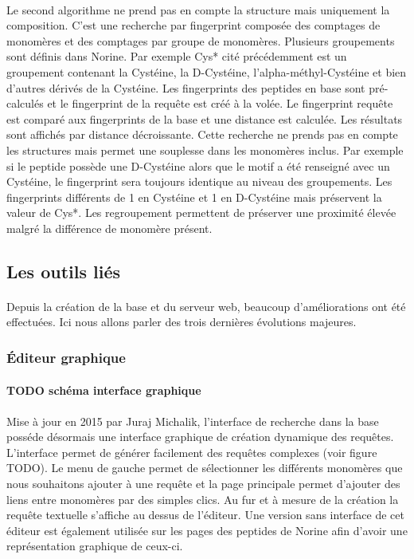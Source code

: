 \documentclass[12pt,french,twoside]{report}
\begin{document}
\paragraph{}Le second algorithme ne prend pas en compte la structure mais uniquement la composition.
C'est une recherche par fingerprint composée des comptages de monomères et des comptages par groupe de monomères.
Plusieurs groupements sont définis dans Norine.
Par exemple Cys* cité précédemment est un groupement contenant la Cystéine, la D-Cystéine, l'alpha-méthyl-Cystéine et bien d'autres dérivés de la Cystéine.
Les fingerprints des peptides en base sont pré-calculés et le fingerprint de la requête est créé à la volée.
Le fingerprint requête est comparé aux fingerprints de la base et une distance est calculée.
Les résultats sont affichés par distance décroissante.
Cette recherche ne prends pas en compte les structures mais permet une souplesse dans les monomères inclus.
Par exemple si le peptide possède une D-Cystéine alors que le motif a été renseigné avec un Cystéine, le fingerprint sera toujours identique au niveau des groupements.
Les fingerprints différents de 1 en Cystéine et 1 en D-Cystéine mais préservent la valeur de Cys*.
Les regroupement permettent de préserver une proximité élevée malgré la différence de monomère présent.



\subsection{Les outils liés}

\paragraph{}Depuis la création de la base et du serveur web, beaucoup d'améliorations ont été effectuées.
Ici nous allons parler des trois dernières évolutions majeures.


\subsubsection{Éditeur graphique}

\paragraph{TODO schéma interface graphique}

\paragraph{}Mise à jour en 2015 par Juraj Michalik, l'interface de recherche dans la base posséde désormais une interface graphique de création dynamique des requêtes.
L'interface permet de générer facilement des requêtes complexes (voir figure TODO).
Le menu de gauche permet de sélectionner les différents monomères que nous souhaitons ajouter à une requête et la page principale permet d'ajouter des liens entre monomères par des simples clics.
Au fur et à mesure de la création la requête textuelle s'affiche au dessus de l'éditeur.
Une version sans interface de cet éditeur est également utilisée sur les pages des peptides de Norine afin d'avoir une représentation graphique de ceux-ci.
\end{document}

